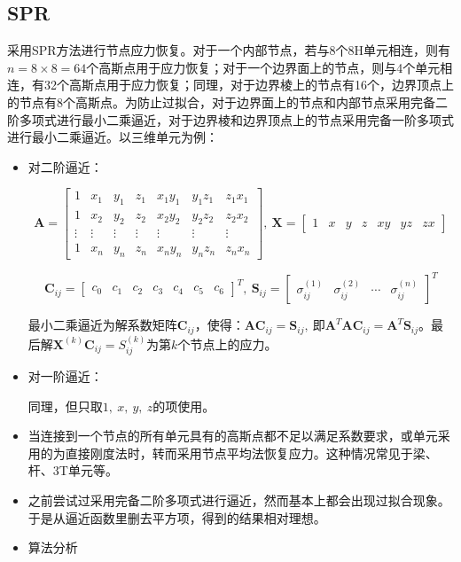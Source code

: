 \documentclass[UTF8]{ctexbook}
\begin{document}
\subsection{SPR}

采用SPR方法进行节点应力恢复。对于一个内部节点，若与8个8H单元相连，则有$n=8\times8=64$个高斯点用于应力恢复；对于一个边界面上的节点，则与4个单元相连，有32个高斯点用于应力恢复；同理，对于边界棱上的节点有16个，边界顶点上的节点有8个高斯点。为防止过拟合，对于边界面上的节点和内部节点采用完备二阶多项式进行最小二乘逼近，对于边界棱和边界顶点上的节点采用完备一阶多项式进行最小二乘逼近。以三维单元为例：
\begin{itemize}
\item 对二阶逼近：


\[
\boldsymbol{A}=\begin{bmatrix}1 & x_{1} & y_{1} & z_{1} & x_{1}y_{1} & y_{1}z_{1} & z_{1}x_{1}\\
1 & x_{2} & y_{2} & z_{2} & x_{2}y_{2} & y_{2}z_{2} & z_{2}x_{2}\\
\vdots & \vdots & \vdots & \vdots & \vdots & \vdots & \vdots\\
1 & x_{n} & y_{n} & z_{n} & x_{n}y_{n} & y_{n}z_{n} & z_{n}x_{n}
\end{bmatrix},\ \boldsymbol{X}=\begin{bmatrix}1 & x & y & z & xy & yz & zx\end{bmatrix}
\]



\[
\boldsymbol{C}_{ij}=\begin{bmatrix}c_{0} & c_{1} & c_{2} & c_{3} & c_{4} & c_{5} & c_{6}\end{bmatrix}^{T},\ \boldsymbol{S}_{ij}=\begin{bmatrix}\sigma_{ij}^{(1)} & \sigma_{ij}^{(2)} & \cdots & \sigma_{ij}^{(n)}\end{bmatrix}^{T}
\]



最小二乘逼近为解系数矩阵$\boldsymbol{C}_{ij}$，使得：$\boldsymbol{AC}_{ij}=\boldsymbol{S}_{ij},\ \text{即}\boldsymbol{A}^{T}\boldsymbol{AC}_{ij}=\boldsymbol{A}^{T}\boldsymbol{S}_{ij}$。最后解$\boldsymbol{X}^{(k)}\boldsymbol{C}_{ij}=S_{ij}^{(k)}$为第$k$个节点上的应力。

\item 对一阶逼近：


同理，但只取$1,\ x,\ y,\ z$的项使用。

\item 当连接到一个节点的所有单元具有的高斯点都不足以满足系数要求，或单元采用的为直接刚度法时，转而采用节点平均法恢复应力。这种情况常见于梁、杆、3T单元等。
\item 之前尝试过采用完备二阶多项式进行逼近，然而基本上都会出现过拟合现象。于是从逼近函数里删去平方项，得到的结果相对理想。
\item 算法分析


\end{itemize}
\end{document}
